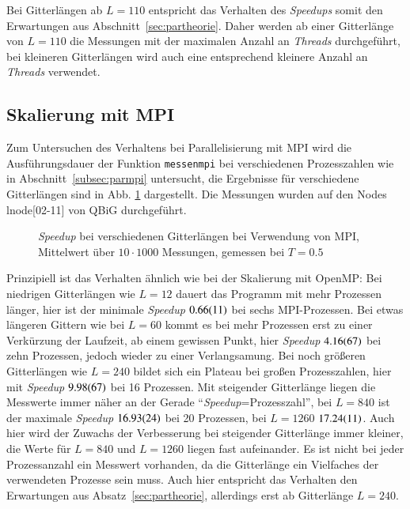	
	Bei Gitterlängen ab $L=110$ entspricht das Verhalten des \textit{Speedups} somit den Erwartungen aus Abschnitt~\ref{sec:partheorie}. Daher werden ab einer Gitterlänge von $L=110$ die Messungen mit der maximalen Anzahl an \textit{Threads} durchgeführt, bei kleineren Gitterlängen wird auch eine entsprechend kleinere Anzahl an \textit{Threads} verwendet. 
	
	\subsection{Skalierung mit MPI}
	\label{subsec:ergebnissempi}
	
	Zum Untersuchen des Verhaltens bei Parallelisierung mit MPI wird die Ausführungsdauer der Funktion \texttt{messenmpi} bei verschiedenen Prozesszahlen wie in Abschnitt~\ref{subsec:parmpi} untersucht, die Ergebnisse für verschiedene Gitterlängen sind in Abb. \ref{fig:skalierunglaengempi} dargestellt. Die Messungen wurden auf den Nodes lnode[02-11] von QBiG durchgeführt.
	
		\begin{figure}[htbp]
			
			\caption[\textit{Speedup} bei verschiedenen Gitterlängen bei Verwendung von MPI]{\textit{Speedup} bei verschiedenen Gitterlängen bei Verwendung von MPI, Mittelwert über $10 \cdot 1000$ Messungen, gemessen bei $T=\num{0,5}$}
			\label{fig:skalierunglaengempi}
		\end{figure}
		
	Prinzipiell ist das Verhalten ähnlich wie bei der Skalierung mit OpenMP: Bei niedrigen Gitterlängen wie $L=12$ dauert das Programm mit mehr Prozessen länger, hier ist der minimale \textit{Speedup} $\num{0,66\pm0,11}$ bei sechs MPI-Prozessen. Bei etwas längeren Gittern wie bei $L=60$ kommt es bei mehr Prozessen erst zu einer Verkürzung der Laufzeit, ab einem gewissen Punkt, hier \textit{Speedup} $\num{4,16\pm0,67}$ bei zehn Prozessen, jedoch wieder zu einer Verlangsamung. Bei noch größeren Gitterlängen wie $L=240$ bildet sich ein Plateau bei großen Prozesszahlen, hier mit \textit{Speedup} $\num{9,98\pm 0,67}$ bei 16 Prozessen. Mit steigender Gitterlänge liegen die Messwerte immer näher an der Gerade \enquote{\textit{Speedup}=Prozesszahl}, bei $L=840$ ist der maximale \textit{Speedup} $\num{16,93\pm0,24}$ bei 20 Prozessen, bei $L=1260$ $\num{17,24\pm0,11}$. Auch hier wird der Zuwachs der Verbesserung bei steigender Gitterlänge immer kleiner, die Werte für $L=840$ und $L=1260$ liegen fast aufeinander. Es ist nicht bei jeder Prozessanzahl ein Messwert vorhanden, da die Gitterlänge ein Vielfaches der verwendeten Prozesse sein muss.
	Auch hier entspricht das Verhalten den Erwartungen aus Absatz~\ref{sec:partheorie}, allerdings erst ab Gitterlänge $L=240$.

